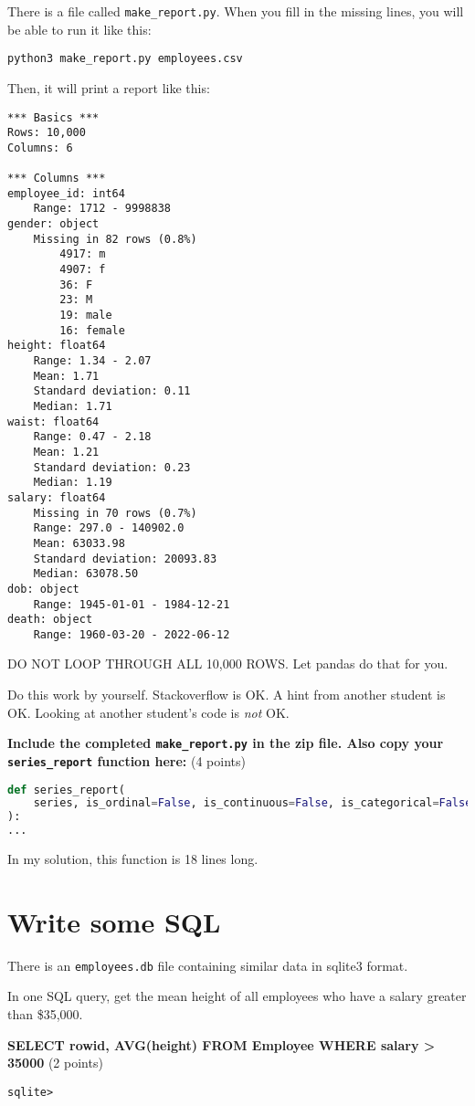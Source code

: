 \documentclass[11pt,english]{article}
\begin{document}
There is a file called \texttt{make\_report.py}.  When you fill in the missing lines, you will be able to run it like this:

\begin{Verbatim}
python3 make_report.py employees.csv
\end{Verbatim}

Then, it will print a report like this:
\begin{Verbatim}
*** Basics ***
Rows: 10,000
Columns: 6

*** Columns ***
employee_id: int64
	Range: 1712 - 9998838
gender: object
	Missing in 82 rows (0.8%)
		4917: m
		4907: f
		36: F
		23: M
		19: male
		16: female
height: float64
	Range: 1.34 - 2.07
	Mean: 1.71
	Standard deviation: 0.11
	Median: 1.71
waist: float64
	Range: 0.47 - 2.18
	Mean: 1.21
	Standard deviation: 0.23
	Median: 1.19
salary: float64
	Missing in 70 rows (0.7%)
	Range: 297.0 - 140902.0
	Mean: 63033.98
	Standard deviation: 20093.83
	Median: 63078.50
dob: object
	Range: 1945-01-01 - 1984-12-21
death: object
	Range: 1960-03-20 - 2022-06-12
\end{Verbatim}

DO NOT LOOP THROUGH ALL 10,000 ROWS.  Let pandas do that for you.

Do this work by yourself.   Stackoverflow is OK.   A hint from another student is OK.  Looking at another student's code is \emph{not} OK.

\textbf{Include the completed  \texttt{make\_report.py} in the zip file.   Also copy your \texttt{series\_report}  function here:} (4 points)
\begin{lstlisting}[language=Python]
def series_report(
    series, is_ordinal=False, is_continuous=False, is_categorical=False
):
...
\end{lstlisting}

In my solution,  this function is 18 lines long.

\section{Write some SQL}

There is an \texttt{employees.db} file containing similar data in sqlite3 format.

In one SQL query,  get the mean height of all employees who have a salary greater than \$35,000.

\textbf{ SELECT rowid, AVG(height) FROM Employee WHERE salary > 35000 } (2 points)
\begin{lstlisting}
sqlite>
\end{lstlisting}
\end{document}
